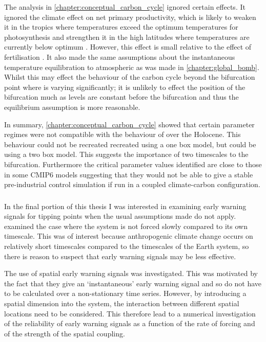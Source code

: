 The analysis in \cref{chapter:conceptual_carbon_cycle} ignored certain effects. It ignored the climate effect on net primary productivity, which is likely to weaken it
in the tropics where temperatures exceed the optimum temperatures for photosynthesis and strengthen it in the high latitudes where temperatures are currently
below optimum \parencite{Sage2007}.
However, this effect is small relative to the effect of  fertilisation \parencite{Arora2020}.
It also made the same assumptions about the instantaneous temperature equilibration to atmospheric  as was made in \cref{chapter:global_bomb}.
Whilst this may effect the behaviour of the carbon cycle beyond the bifurcation point where  is varying significantly;
it is unlikely to effect the position of the bifurcation much as  levels are constant before the bifurcation and thus the equilibrium assumption is more reasonable.

In summary, \cref{chapter:conceptual_carbon_cycle} showed that certain parameter regimes were not compatible with the behaviour of  over the Holocene.
This behaviour could not be recreated recreated using a one box model, but could be using a two box model. This suggests the importance of two timescales to the bifurcation.
Furthermore the critical parameter values identified are close to those in
some CMIP6 models suggesting that they would not be able to give a stable pre-industrial control simulation if run in a coupled climate-carbon configuration.

\subsubsection{}

In the final portion of this thesis I was interested in examining early warning signals for tipping points when the usual assumptions made do not apply.
 examined the case where the system is not forced slowly compared to its own timescale. This was of interest because anthropogenic climate change
occurs on relatively short timescales compared to the timescales of the Earth system, so there is reason to suspect that early warning signals may be less effective.

The use of spatial early warning signals was investigated. This was motivated by the fact that they give an `instantaneous' early warning signal and so do not have
to be calculated over a non-stationary time series. However, by introducing a spatial dimension into the system, the interaction between different spatial locations
need to be considered. This therefore lead to a numerical investigation of the reliability of early warning signals as a function of the rate of forcing and of the strength of
the spatial coupling.

